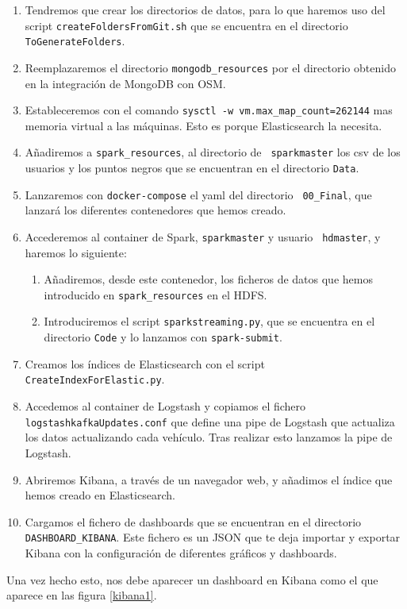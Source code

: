 \begin{enumerate}
\item Tendremos que crear los directorios de datos, para lo que haremos uso
  del script {\tt createFoldersFromGit.sh} que se encuentra en el
  directorio {\tt ToGenerateFolders}.
\item Reemplazaremos el directorio {\tt mongodb\_resources} por el
  directorio obtenido en la integración de MongoDB con OSM.
\item Estableceremos con el comando {\tt sysctl -w
    vm.max\_map\_count=262144} mas memoria virtual a las máquinas. Esto es
  porque Elasticsearch la necesita.
\item Añadiremos a {\tt spark\_resources}, al directorio de {\tt
    sparkmaster} los csv de los usuarios y los puntos negros que se
  encuentran en el directorio {\tt Data}.
\item Lanzaremos con {\tt docker-compose} el yaml del directorio {\tt
    00\_Final}, que lanzará los diferentes contenedores que hemos creado.
\item Accederemos al container de Spark, {\tt sparkmaster} y usuario {\tt
    hdmaster}, y haremos lo siguiente:
\begin{enumerate}
\item Añadiremos, desde este contenedor, los ficheros de datos que hemos
  introducido en {\tt spark\_resources} en el HDFS.
\item Introduciremos el script {\tt sparkstreaming.py}, que se encuentra en
  el directorio {\tt Code} y lo lanzamos con {\tt spark-submit}.
\end{enumerate}
\item Creamos los índices de Elasticsearch con el script {\tt
    CreateIndexForElastic.py}.
\item Accedemos al container de Logstash y copiamos el fichero {\tt
    logstashkafkaUpdates.conf} que define una pipe de Logstash que
  actualiza los datos actualizando cada vehículo. Tras realizar esto
  lanzamos la pipe de Logstash.
\item Abriremos Kibana, a través de un navegador web, y añadimos el índice
  que hemos creado en Elasticsearch.
\item Cargamos el fichero de dashboards que se encuentran en el directorio
  {\tt DASHBOARD\_KIBANA}. Este fichero es un JSON que te deja importar y
  exportar Kibana con la configuración de diferentes gráficos y dashboards.
\end{enumerate}

Una vez hecho esto, nos debe aparecer un dashboard en Kibana como el que
aparece en las figura \ref{kibana1}.

